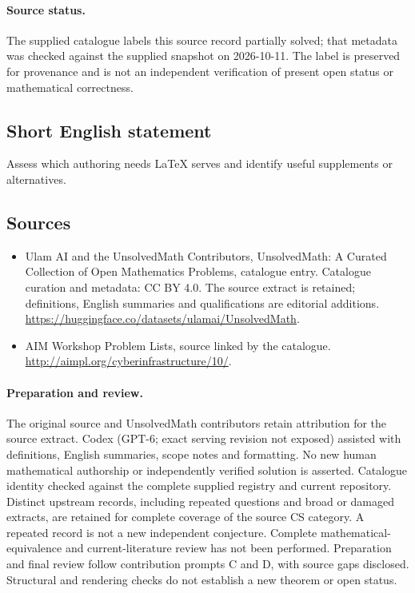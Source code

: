 \documentclass[11pt]{article}
\begin{document}
\paragraph{Source status.}
The supplied catalogue labels this source record partially solved; that metadata was checked against the supplied snapshot on 2026-10-11. The label is preserved for provenance and is not an independent verification of present open status or mathematical correctness.
\subsection{Short English statement}
Assess which authoring needs LaTeX serves and identify useful supplements or alternatives.
\subsection{Sources}
\begin{itemize}
\item[\hypertarget{source:statement:1}{S1}] Ulam AI and the UnsolvedMath Contributors, UnsolvedMath: A Curated Collection of Open Mathematics Problems, catalogue entry. Catalogue curation and metadata: CC BY 4.0. The source extract is retained; definitions, English summaries and qualifications are editorial additions.
\url{https://huggingface.co/datasets/ulamai/UnsolvedMath}.
\item[\hypertarget{source:statement:2}{S2}] AIM Workshop Problem Lists, source linked by the catalogue.
\url{http://aimpl.org/cyberinfrastructure/10/}.
\end{itemize}
\paragraph{Preparation and review.}
The original source and UnsolvedMath contributors retain attribution for the source extract. Codex (GPT-6; exact serving revision not exposed) assisted with definitions, English summaries, scope notes and formatting. No new human mathematical authorship or independently verified solution is asserted. Catalogue identity checked against the complete supplied registry and current repository. Distinct upstream records, including repeated questions and broad or damaged extracts, are retained for complete coverage of the source CS category. A repeated record is not a new independent conjecture. Complete mathematical-equivalence and current-literature review has not been performed. Preparation and final review follow contribution prompts C and D, with source gaps disclosed. Structural and rendering checks do not establish a new theorem or open status.
\label{end:statement}
\end{document}
